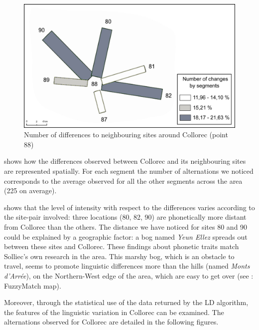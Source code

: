 \documentclass[output=paper]{LSP/langsci}
\begin{document}
\begin{figure}
\includegraphics[width=\textwidth]{illustrations/brun_etal_fig7}
\caption{Number of differences to neighbouring sites around Collorec (point 88)}
\label{fig:7}
\end{figure}

 shows how the differences observed between Collorec and its neighbouring sites are represented spatially. For each segment the number of alternations we noticed corresponds to the average observed for all the other segments across the area (225 on average).

 shows that the level of intensity with respect to the differences varies according to the site-pair involved: three locations (80, 82, 90) are phonetically more distant from Collorec than the others. The distance we have noticed for sites 80 and 90 could be explained by a geographic factor: a bog named \textit{Yeun Ellez} spreads out between these sites and Collorec. These findings about phonetic traits match Solliec's own research in the area. This marshy bog, which is an obstacle to travel, seems to promote linguistic differences more than the hills (named \textit{Monts d'Arrée}), on the Northern-West edge of the area, which are easy to get over (see : FuzzyMatch map).

Moreover, through the statistical use of the data returned by the LD algorithm, the features of the linguistic variation in Collorec can be examined. The alternations observed for Collorec are detailed in the following figures.
\end{document}
